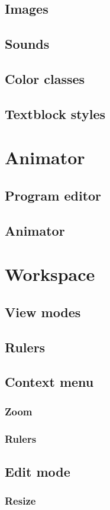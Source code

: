 \documentclass[titlepage,oneside,11pt]{book}
\begin{document}
\subsection{Images}
\subsection{Sounds}
\subsection{Color classes}
\subsection{Textblock styles}
\section{Animator}
\subsection{Program editor}
\subsection{Animator}
\section{Workspace}
\subsection{View modes}
\subsection{Rulers}
\subsection{Context menu}
\subsubsection{Zoom}
\subsubsection{Rulers}
\subsection{Edit mode}
\subsubsection{Resize}
\end{document}
